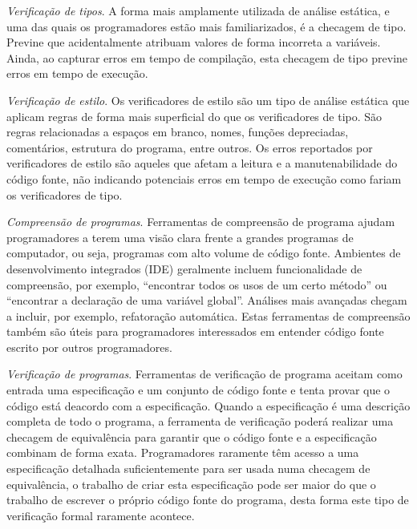 \begin{description}

  \item \textit{Verificação de tipos}. 
    A forma mais amplamente utilizada de análise estática, e uma das quais os
    programadores estão mais familiarizados, é a checagem de tipo.
    Previne que acidentalmente atribuam valores de forma incorreta a
    variáveis. Ainda, ao capturar erros em tempo de compilação, esta checagem
    de tipo previne erros em tempo de execução.

  \item \textit{Verificação de estilo}. 
    Os verificadores de estilo são um tipo de análise estática que aplicam regras
    de forma mais superficial do que os verificadores de tipo. São regras
    relacionadas a espaços em branco, nomes, funções depreciadas, comentários,
    estrutura do programa, entre outros. Os erros reportados por verificadores de
    estilo são aqueles que afetam a leitura e a manutenabilidade do
    código fonte, não indicando potenciais erros em tempo de execução como
    fariam os verificadores de tipo.

  \item \textit{Compreensão de programas}. 
    Ferramentas de compreensão de programa ajudam programadores a terem uma visão
    clara frente a grandes programas de computador, ou seja, programas com
    alto volume de código fonte. Ambientes de desenvolvimento integrados (IDE)
    geralmente incluem funcionalidade de compreensão, por exemplo, ``encontrar
    todos os usos de um certo método'' ou ``encontrar a declaração de uma
    variável global''. Análises mais avançadas chegam a incluir, por exemplo,
    refatoração automática. Estas ferramentas de compreensão também são úteis
    para programadores interessados em entender código fonte escrito por
    outros programadores.

  \item \textit{Verificação de programas}.
    Ferramentas de verificação de programa aceitam como entrada uma especificação
    e um conjunto de código fonte e tenta provar que o código está deacordo
    com a especificação. Quando a especificação é uma descrição completa de
    todo o programa, a ferramenta de verificação poderá realizar uma checagem
    de equivalência para garantir que o código fonte e a especificação
    combinam de forma exata. Programadores raramente têm acesso a uma
    especificação detalhada suficientemente para ser usada numa checagem de
    equivalência, o trabalho de criar esta especificação pode ser maior do que
    o trabalho de escrever o próprio código fonte do programa, desta forma
    este tipo de verificação formal raramente acontece.


\end{description}
